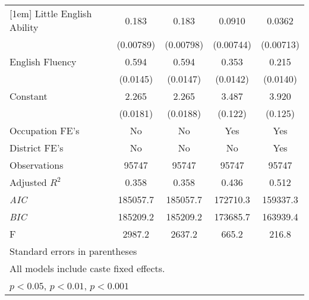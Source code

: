 \begin{table}[htbp]
\begin{tabular}{l*{4}{c}}
[1em]
Little English Ability&    0.183\sym{***}&    0.183\sym{***}&   0.0910\sym{***}&   0.0362\sym{***}\\
                &(0.00789)         &(0.00798)         &(0.00744)         &(0.00713)         \\
[1em]
English Fluency &    0.594\sym{***}&    0.594\sym{***}&    0.353\sym{***}&    0.215\sym{***}\\
                & (0.0145)         & (0.0147)         & (0.0142)         & (0.0140)         \\
[1em]
Constant        &    2.265\sym{***}&    2.265\sym{***}&    3.487\sym{***}&    3.920\sym{***}\\
                & (0.0181)         & (0.0188)         &  (0.122)         &  (0.125)         \\
[1em]
Occupation FE's &       No         &       No         &      Yes         &      Yes         \\
[1em]
District FE's   &       No         &       No         &       No         &      Yes         \\
\hline
Observations    &    95747         &    95747         &    95747         &    95747         \\
Adjusted \(R^{2}\)&    0.358         &    0.358         &    0.436         &    0.512         \\
\textit{AIC}    & 185057.7         & 185057.7         & 172710.3         & 159337.3         \\
\textit{BIC}    & 185209.2         & 185209.2         & 173685.7         & 163939.4         \\
F               &   2987.2         &   2637.2         &    665.2         &    216.8         \\
\hline\hline
\multicolumn{5}{l}{\footnotesize Standard errors in parentheses}\\
\multicolumn{5}{l}{\footnotesize All models include caste fixed effects.}\\
\multicolumn{5}{l}{\footnotesize \sym{*} \(p<0.05\), \sym{**} \(p<0.01\), \sym{***} \(p<0.001\)}\\
\end{tabular}
\end{table}
